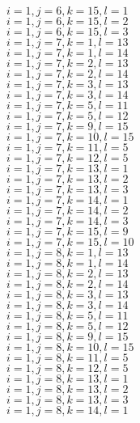 \documentclass[14pt]{article}
\begin{document}
    $i=1,j=6,k=15,l=1 $ \\ 
    $i=1,j=6,k=15,l=2 $ \\ 
    $i=1,j=6,k=15,l=3 $ \\ 
    $i=1,j=7,k=1,l=13 $ \\ 
    $i=1,j=7,k=1,l=14 $ \\ 
    $i=1,j=7,k=2,l=13 $ \\ 
    $i=1,j=7,k=2,l=14 $ \\ 
    $i=1,j=7,k=3,l=13 $ \\ 
    $i=1,j=7,k=3,l=14 $ \\ 
    $i=1,j=7,k=5,l=11 $ \\ 
    $i=1,j=7,k=5,l=12 $ \\ 
    $i=1,j=7,k=9,l=15 $ \\ 
    $i=1,j=7,k=10,l=15 $ \\ 
    $i=1,j=7,k=11,l=5 $ \\ 
    $i=1,j=7,k=12,l=5 $ \\ 
    $i=1,j=7,k=13,l=1 $ \\ 
    $i=1,j=7,k=13,l=2 $ \\ 
    $i=1,j=7,k=13,l=3 $ \\ 
    $i=1,j=7,k=14,l=1 $ \\ 
    $i=1,j=7,k=14,l=2 $ \\ 
    $i=1,j=7,k=14,l=3 $ \\ 
    $i=1,j=7,k=15,l=9 $ \\ 
    $i=1,j=7,k=15,l=10 $ \\ 
    $i=1,j=8,k=1,l=13 $ \\ 
    $i=1,j=8,k=1,l=14 $ \\ 
    $i=1,j=8,k=2,l=13 $ \\ 
    $i=1,j=8,k=2,l=14 $ \\ 
    $i=1,j=8,k=3,l=13 $ \\ 
    $i=1,j=8,k=3,l=14 $ \\ 
    $i=1,j=8,k=5,l=11 $ \\ 
    $i=1,j=8,k=5,l=12 $ \\ 
    $i=1,j=8,k=9,l=15 $ \\ 
    $i=1,j=8,k=10,l=15 $ \\ 
    $i=1,j=8,k=11,l=5 $ \\ 
    $i=1,j=8,k=12,l=5 $ \\ 
    $i=1,j=8,k=13,l=1 $ \\ 
    $i=1,j=8,k=13,l=2 $ \\ 
    $i=1,j=8,k=13,l=3 $ \\ 
    $i=1,j=8,k=14,l=1 $ \\ 
\end{document}
